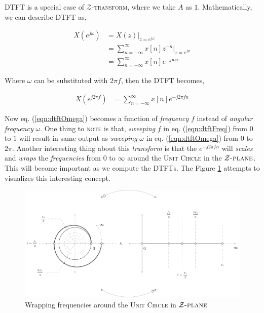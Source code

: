 \documentclass[../../course]{subfiles}
\begin{document}
\textsc{DTFT} is a special case of $\mathcal{Z}$\textsc{-transform}, where we take $A$
as $1$. Mathematically, we can describe \textsc{DTFT} as,

\begin{align}
    X(e^{j \omega}) &= X(z) |_{z = e^{j \omega}} \\
    &= \sum_{n = - \infty}^{\infty} x[n] z^{-n} \Big|_{z = e^{jw}} \\
    &= \sum_{n = - \infty}^{\infty} x[n] e^{-j w n} \label{eqn:dtftOmega}
\end{align}

Where $\omega$ can be substituted with $2 \pi f$, then the \textsc{DTFT} becomes,

\begin{align}
    X(e^{j 2 \pi f}) &= \sum_{n = - \infty}^{\infty} x[n] e^{-j 2 \pi f n}
    \label{eqn:dtftFreq}
\end{align}

Now eq. (\ref{eqn:dtftOmega}) becomes a function of \emph{frequency} $f$
instead of \emph{angular frequency} $\omega$. One thing to \textsc{note} is that,
\emph{sweeping} $f$ in eq. (\ref{eqn:dtftFreq}) from $0$ to $1$ will result in same
output as \emph{sweeping} $\omega$ in eq. (\ref{eqn:dtftOmega}) from $0$ to $2 \pi$.
Another interesting thing about this \emph{transform} is that the $e^{-j 2 \pi f n}$ will
\emph{scales} and \emph{wraps} the \emph{frequencies} from $0$ to $\infty$ around
the \textsc{Unit Circle} in the $\mathcal{Z} \textsc{-plane}$. This will become
important as we compute the \textsc{DTFT}s. The Figure \ref{fig:wrapFreqUnitCircle}
attempts to visualizes this interesting concept.

\begin{figure}
    \centering
     {
        \includegraphics[height = 1\textheight] {tikzpics/epicWrapFreqUnitCircle.pdf}
    }
     {
        Wrapping frequencies around the \textsc{Unit Circle} in $\mathcal{Z}\textsc{-plane}$
    }
    \label{fig:wrapFreqUnitCircle}
\end{figure}
\end{document}
